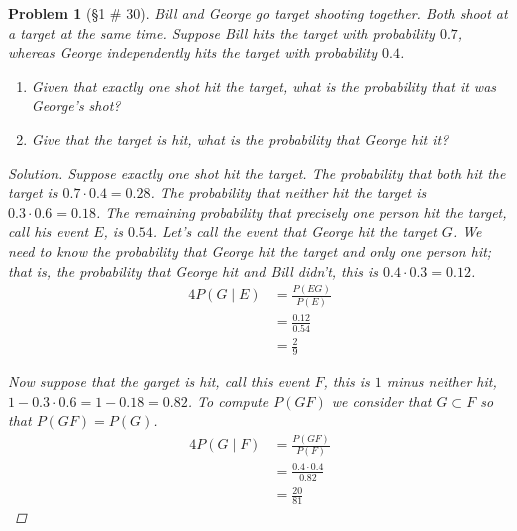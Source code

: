\documentclass[11pt, oneside]{book}   	%
\newtheorem{problem}{Problem}
\begin{document}
\begin{problem}[\S 1 \# 30]
	Bill and George go target shooting together. Both shoot at a target at the same time. Suppose Bill hits the target with probability $0.7$, whereas George independently hits the target with probability $0.4$. 
	\begin{enumerate}
		\item Given that exactly one shot hit the target, what is the probability that it was George's shot? 
		\item Give that the target is hit, what is the probability that George hit it? 
	\end{enumerate}
	\begin{proof}[Solution]
		Suppose exactly one shot hit the target. The probability that both hit the target is $0.7\cdot 0.4=0.28$. The probability that neither hit the target is $0.3\cdot 0.6=0.18$. The remaining probability that precisely one person hit the target, call his event $E$, is $0.54$. Let's call the event that George hit the target $G$. We need to know the probability that George hit the target and only one person hit; that is, the probability that George hit and Bill didn't, this is $0.4\cdot 0.3 = 0.12$. 
		\begin{alignat*}{4}
			P(G\mid E) &= \frac{P(EG)}{P(E)} \\
				&=\frac{0.12}{0.54} \\ 
				&=\frac{2}{9}
		\end{alignat*}
		
		Now suppose that the garget is hit, call this event $F$, this is $1$ minus neither hit, $1-0.3\cdot 0.6 = 1-0.18 = 0.82$. To compute $P(GF)$ we consider that $G\subset F$ so that $P(GF)=P(G)$. 
		\begin{alignat*}{4}
			P(G\mid F) &= \frac{P(GF)}{P(F)} \\
				&=\frac{0.4\cdot 0.4}{0.82} \\
				&=\frac{20}{81}
		\end{alignat*}
	\end{proof}
\end{problem}
\end{document}
